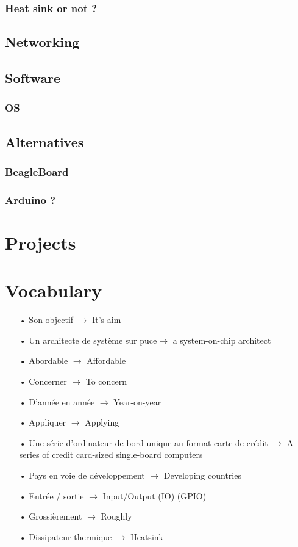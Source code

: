 \documentclass[10pt,a4paper]{article}
\begin{document}
\subsubsection{Heat sink or not ?}

\subsection{Networking}

\subsection{Software}

\subsubsection{OS}

\subsection{Alternatives}

\subsubsection{BeagleBoard}

\subsubsection{Arduino ?}

\section{Projects}

\newpage

\section{Vocabulary}

\begin{itemize}
\item[•] Son objectif $\rightarrow$ It's aim
\item[•] Un architecte de système sur puce$\rightarrow$ a system-on-chip architect
\item[•] Abordable $\rightarrow$ Affordable
\item[•] Concerner $\rightarrow$ To concern
\item[•] D'année en année $\rightarrow$ Year-on-year
\item[•] Appliquer $\rightarrow$ Applying
\item[•] Une série d'ordinateur de bord unique au format carte de crédit $\rightarrow$ A series of credit card-sized single-board computers
\item[•] Pays en voie de développement $\rightarrow$ Developing countries
\item[•] Entrée / sortie $\rightarrow$ Input/Output (IO) (GPIO)
\item[•] Grossièrement $\rightarrow$ Roughly
\item[•] Dissipateur thermique $\rightarrow$ Heatsink
\end{itemize}
\end{document}
